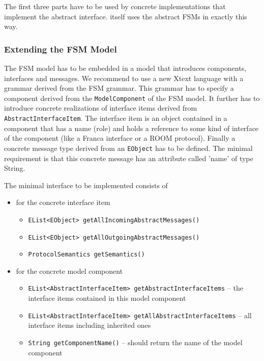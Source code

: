 The first three parts have to be used by concrete implementations that implement the abstract interface.
\eTrice{} itself uses the abstract FSMs in exactly this way.

\subsubsection*{Extending the FSM Model}

The \eTrice{} FSM model has to be embedded in a model that introduces components, interfaces and messages.
We recommend to use a new Xtext language with a grammar derived from the FSM grammar.
This grammar has to specify a component derived from the \texttt{ModelComponent} of the FSM model.
It further has to introduce concrete realizations of interface items derived from \texttt{AbstractInterfaceItem}.
The interface item is an object contained in a component that has a name (role) and holds a reference to some kind of interface of the
component (like a Franca interface or a ROOM protocol).
Finally a concrete message type derived from an \texttt{EObject} has to be defined. The minimal requirement is that this concrete message
has an attribute called 'name' of type String.

The minimal interface to be implemented consists of
\begin{itemize}
	\item for the concrete interface item
	\begin{itemize}
		\item \texttt{EList<EObject> getAllIncomingAbstractMessages()}
		\item \texttt{EList<EObject> getAllOutgoingAbstractMessages()}
		\item \texttt{ProtocolSemantics getSemantics()}
	\end{itemize}
	\item for the concrete model component
	\begin{itemize}
		\item \texttt{EList<AbstractInterfaceItem> getAbstractInterfaceItems} -- the interface items contained in this model component
		\item \texttt{EList<AbstractInterfaceItem> getAllAbstractInterfaceItems} -- all interface items including inherited ones
		\item \texttt{String getComponentName()} -- should return the name of the model component
	\end{itemize}
\end{itemize}

